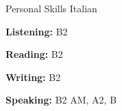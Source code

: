 
\begin{rubric}{Personal Skills}
	Italian
\entry*[English]
	\par \textbf{Listening:} B2
	\par \textbf{Reading:} B2
	\par \textbf{Writing:} B2
	\par \textbf{Speaking:} B2
	AM, A2, B
\end{rubric}
